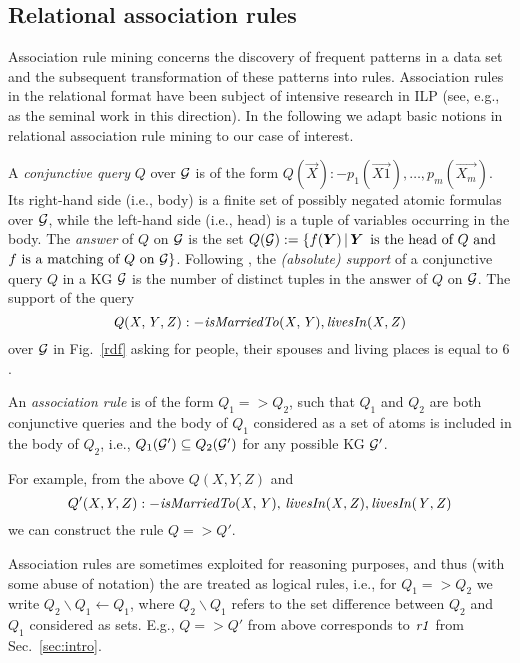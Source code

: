 \subsection{Relational association rules}
Association rule mining concerns the discovery of frequent patterns in a data set and the subsequent transformation of these patterns into rules. Association rules in the relational format have been subject of intensive research in ILP (see, e.g., \cite{DBLP:conf/ilp/DehaspeR97} as the seminal work in this direction). In the following we adapt basic notions in relational association rule mining to our case of interest.

A \emph{conjunctive query} $Q$ over $\mathcal{G}$ is of the form $Q(\vec{X}):-p_1(\vec{X1}),\dotsc,p_m(\vec{X_m})$. Its  right-hand side (i.e., body) is a finite set of possibly negated atomic formulas over $\mathcal{G}$, while the left-hand side (i.e., head) is a tuple of variables occurring in the body. The \emph{answer} of $Q$ on $\mathcal{G}$ is the set $Q(\cG):=\{f(\vec{Y})\,|\,\vec{Y}\,\text{  is the head of } Q \text{ and }$\\$ f \text{ is a matching of } Q \text{ on } \mathcal{G}\}$.
Following \cite{DBLP:conf/ilp/DehaspeR97}, the \emph{(absolute) support} of a conjunctive query $Q$ in a KG $\mathcal{G}$ is the number of distinct tuples in the answer of $Q$ on $\mathcal{G}$. The support of the query
\begin{equation}\mathit{Q(X,Y,Z):-isMarriedTo(X,Y),\, }\mathit{livesIn(X,Z)}
\end{equation}
over $\mathcal{G}$ in Fig.~\ref{rdf} asking for people, their spouses and living places is equal to $6$. 

An \emph{association rule} is of the form $Q_1 => Q_2$, such that $Q_1$ and $Q_2$ are both conjunctive queries and the body of $Q_1$ considered as a set of atoms is included in the body of $Q_2$,  i.e., $Q_1(\mathcal{G}')\subseteq Q_2(\mathcal{G}')$ for any possible KG $\mathcal{G}'$. 

For example, from the above $Q(X,Y,Z)$ and
\begin{equation}Q'(X,Y,Z):-\mathit{isMarriedTo(X,Y),\,livesIn(X,Z),\,} \mathit{livesIn(Y,Z)}
\end{equation} we can construct the rule $Q => Q'$. 

 
Association rules are sometimes exploited for reasoning purposes, and thus (with some abuse of notation) the are treated as logical rules, i.e., for $Q_1=>Q_2$ we write $Q_2\backslash Q_1 \leftarrow Q_1$, where $Q_2 \backslash Q_1$ refers to the set difference between $Q_2$ and $Q_1$ considered as sets. E.g., $Q=>Q'$ from above corresponds to $\mathit{r1}$ from Sec.~\ref{sec:intro}.

